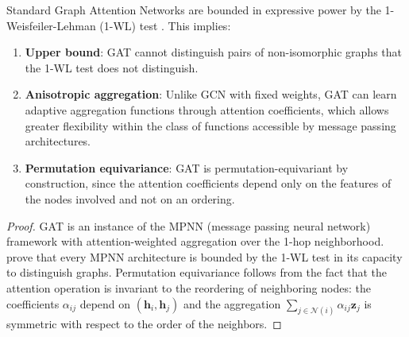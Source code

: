 \begin{proposition}\label{prop:gat_expressive_power}
Standard Graph Attention Networks are bounded in expressive power by the 1-Weisfeiler-Lehman (1-WL) test \citep{xu2019how}. This implies:
\begin{enumerate}
    \item \textbf{Upper bound}: GAT cannot distinguish pairs of non-isomorphic graphs that the 1-WL test does not distinguish.
    \item \textbf{Anisotropic aggregation}: Unlike \gls{GCN} with fixed weights, GAT can learn adaptive aggregation functions through attention coefficients, which allows greater flexibility within the class of functions accessible by message passing architectures.
    \item \textbf{Permutation equivariance}: GAT is permutation-equivariant by construction, since the attention coefficients depend only on the features of the nodes involved and not on an ordering.
\end{enumerate}
\end{proposition}

\begin{proof}
GAT is an instance of the MPNN (message passing neural network) framework with attention-weighted aggregation over the 1-hop neighborhood. \citet{xu2019how} prove that every MPNN architecture is bounded by the 1-WL test in its capacity to distinguish graphs. Permutation equivariance follows from the fact that the attention operation is invariant to the reordering of neighboring nodes: the coefficients $\alpha_{ij}$ depend on $(\mathbf{h}_i, \mathbf{h}_j)$ and the aggregation $\sum_{j \in \mathcal{N}(i)} \alpha_{ij} \mathbf{z}_j$ is symmetric with respect to the order of the neighbors.
\end{proof}


